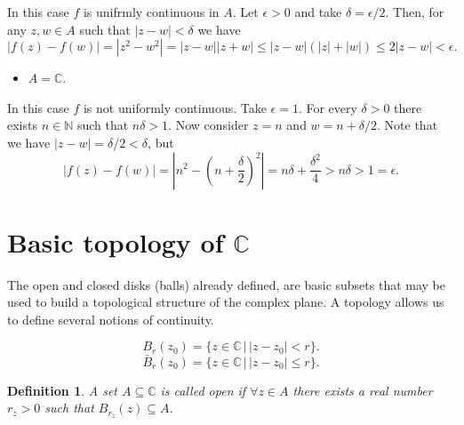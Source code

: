 \documentclass{amsart}
\newtheorem{mydef}{Definition}
\begin{document}
In this case \(f\) is unifrmly continuous in \(A\). Let \(\epsilon>0\) and take \(\delta = \epsilon/2\). Then, for any \(z,w\in A\) such that \(|z-w| < \delta\) we have
\[ |f(z) - f(w) | = |z^2 - w^2| = |z-w||z+w| \leq |z-w| (|z|+|w|) \leq 2 |z-w| < \epsilon. \]

\begin{itemize}
\item \(A = \mathbb{C}\).
\end{itemize}

In this case \(f\) is not uniformly continuous. Take \(\epsilon = 1\). For every \(\delta >0\) there exists \(n\in \mathbb{N}\) such that \(n\delta > 1\). Now consider \(z= n\) and \(w = n + \delta/2\). Note that we have
\(|z - w| = \delta/2 < \delta\), but
\[ |f(z) - f(w) | = |n^2 - \left(n + \frac{\delta}{2}\right)^2| =  n\delta + \frac{\delta^2}{4} > n\delta > 1 = \epsilon. \]

\section{Basic topology of \(\mathbb{C}\)}
\label{sec:org5ead33c}

The open and closed disks (balls) already defined, are basic subsets that may be used to build a topological structure of the complex plane. A topology allows us to define several notions of continuity.

\[ B_r(z_0) = \{ z\in \mathbb{C} \, | \, |z-z_0| < r\}. \]
\[ \bar{B}_r(z_0) = \{ z\in \mathbb{C} \, | \, |z-z_0| \leq r\}. \]

\begin{mydef}
A set \(A\subseteq \mathbb{C}\) is called open if \(\forall z\in A\) there exists a real number \(r_z >0\) such that \(B_{r_z}(z)\subseteq A\).
\end{mydef}
\end{document}

